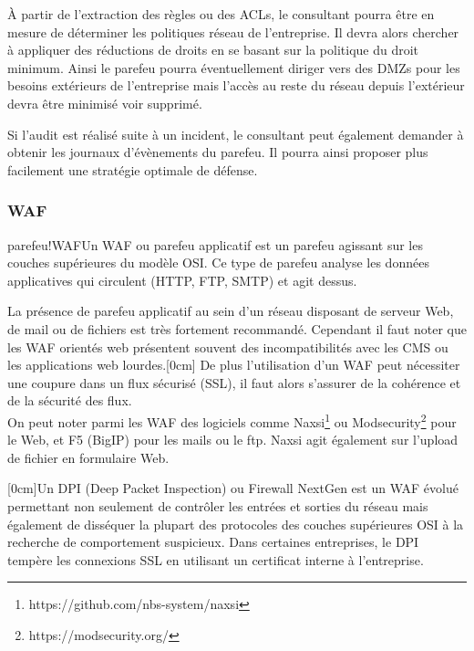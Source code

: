 \documentclass[twoside,a4paper,12pt,titlepage]{book}
\newcommand{\MarginPar}[2]{\marginnote{\scriptsize #1}[#2]}
\begin{document}
	À partir de l'extraction des règles ou des \gls{ACL}s, le consultant pourra être en mesure de déterminer les politiques réseau de l'entreprise. Il devra alors chercher à appliquer des réductions de droits en se basant sur la politique du droit minimum. Ainsi le parefeu pourra éventuellement diriger vers des \gls{DMZ}s pour les besoins extérieurs de l'entreprise mais l'accès au reste du réseau depuis l'extérieur devra être minimisé voir supprimé.
\begin{Warning}Si l'audit est réalisé suite à un incident, le consultant peut également demander à obtenir les journaux d'évènements du parefeu. Il pourra ainsi proposer plus facilement une stratégie optimale de défense.\end{Warning}

	\subsubsection{\gls{WAF}\label{WAF}}
\begin{Define}{parefeu!WAF}Un \gls{WAF} ou parefeu applicatif est un parefeu agissant sur les couches supérieures du modèle OSI. Ce type de parefeu analyse les données applicatives qui circulent (HTTP, FTP, SMTP) et agit dessus.\end{Define}
	La présence de parefeu applicatif au sein d'un réseau disposant de serveur Web, de mail ou de fichiers est très fortement recommandé. Cependant il faut noter que les WAF orientés web présentent souvent des incompatibilités avec les CMS ou les applications web lourdes.\MarginPar{\textbf{Parefeu applicatif}}{0cm} De plus l'utilisation d'un WAF peut nécessiter une coupure dans un flux sécurisé (SSL), il faut alors s'assurer de la cohérence et de la sécurité des flux.\\
	On peut noter parmi les WAF des logiciels comme Naxsi\footnote{https://github.com/nbs-system/naxsi} ou Modsecurity\footnote{https://modsecurity.org/} pour le Web, et F5 (BigIP) pour les mails ou le ftp. Naxsi agit également sur l'upload de fichier en formulaire Web.\\
\begin{Warning}
	\MarginPar{\textbf{DPI}}{0cm}Un DPI (Deep Packet Inspection) ou Firewall NextGen est un WAF évolué permettant non seulement de contrôler les entrées et sorties du réseau mais également de disséquer la plupart des protocoles des couches supérieures OSI à la recherche de comportement suspicieux. Dans certaines entreprises, le DPI tempère les connexions SSL en utilisant un certificat interne à l'entreprise.
\end{Warning}
\end{document}
